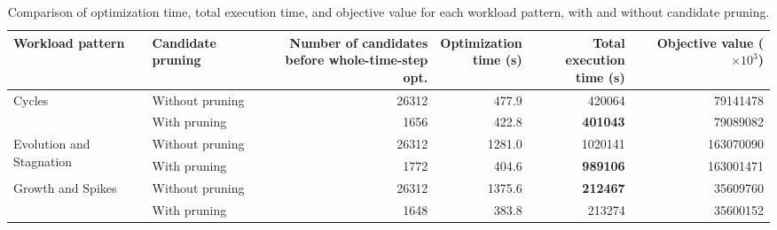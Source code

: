 \begin{table}[t]
\centering
\caption{Comparison of optimization time, total execution time, and objective value for each workload pattern, with and without candidate pruning.}
\label{table:ex3_1}
\begin{tabular}{llrrrr}
\toprule
Workload pattern & Candidate pruning & \shortstack{Number of candidates\\before whole-time-step opt.} & \shortstack{Optimization\\time (s)} & \shortstack{Total execution\\time (s)} & Objective value ($\times 10^{3}$) \\
\midrule
\multirow{2}{*}{Cycles} & Without pruning & 26312 & 477.9 & 420064 & 79141478 \\
\cmidrule(l){2-6}
 & With pruning & 1656 & 422.8 & \textbf{401043} & 79089082 \\
\midrule
\multirow{2}{*}{Evolution and Stagnation} & Without pruning & 26312 & 1281.0 & 1020141 & 163070090 \\
\cmidrule(l){2-6}
 & With pruning & 1772 & 404.6 & \textbf{989106} & 163001471 \\
\midrule
\multirow{2}{*}{Growth and Spikes} & Without pruning & 26312 & 1375.6 & \textbf{212467} & 35609760 \\
\cmidrule(l){2-6}
 & With pruning & 1648 & 383.8 & 213274 & 35600152 \\
\bottomrule
\end{tabular}
\end{table}
